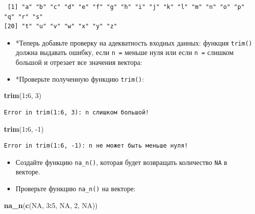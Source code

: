 \documentclass[
]{book}
\newenvironment{Shaded}{\begin{snugshade}}{\end{snugshade}}
\newcommand{\DecValTok}[1]{\textcolor[rgb]{0.00,0.00,0.81}{#1}}
\newcommand{\KeywordTok}[1]{\textcolor[rgb]{0.13,0.29,0.53}{\textbf{#1}}}
\newcommand{\NormalTok}[1]{#1}
\newcommand{\OperatorTok}[1]{\textcolor[rgb]{0.81,0.36,0.00}{\textbf{#1}}}
\newcommand{\OtherTok}[1]{\textcolor[rgb]{0.56,0.35,0.01}{#1}}
\begin{document}
\begin{verbatim}
 [1] "a" "b" "c" "d" "e" "f" "g" "h" "i" "j" "k" "l" "m" "n" "o" "p" "q" "r" "s"
[20] "t" "u" "v" "w" "x" "y" "z"
\end{verbatim}

\begin{itemize}
\item
  *Теперь добавьте проверку на адекватность входных данных: функция \texttt{trim()} должна выдавать ошибку, если \texttt{n\ =} меньше нуля или если \texttt{n\ =} слишком большой и отрезает все значения вектора:
\item
  *Проверьте полученную функцию \texttt{trim()}:
\end{itemize}

\begin{Shaded}
\begin{Highlighting}[]
\KeywordTok{trim}\NormalTok{(}\DecValTok{1}\OperatorTok{:}\DecValTok{6}\NormalTok{, }\DecValTok{3}\NormalTok{)}
\end{Highlighting}
\end{Shaded}

\begin{verbatim}
Error in trim(1:6, 3): n слишком большой!
\end{verbatim}

\begin{Shaded}
\begin{Highlighting}[]
\KeywordTok{trim}\NormalTok{(}\DecValTok{1}\OperatorTok{:}\DecValTok{6}\NormalTok{, }\DecValTok{-1}\NormalTok{)}
\end{Highlighting}
\end{Shaded}

\begin{verbatim}
Error in trim(1:6, -1): n не может быть меньше нуля!
\end{verbatim}

\begin{itemize}
\item
  Создайте функцию \texttt{na\_n()}, которая будет возвращать количество \texttt{NA} в векторе.
\item
  Проверьте функцию \texttt{na\_n()} на векторе:
\end{itemize}

\begin{Shaded}
\begin{Highlighting}[]
\KeywordTok{na_n}\NormalTok{(}\KeywordTok{c}\NormalTok{(}\OtherTok{NA}\NormalTok{, }\DecValTok{3}\OperatorTok{:}\DecValTok{5}\NormalTok{, }\OtherTok{NA}\NormalTok{, }\DecValTok{2}\NormalTok{, }\OtherTok{NA}\NormalTok{))}
\end{Highlighting}
\end{Shaded}
\end{document}
